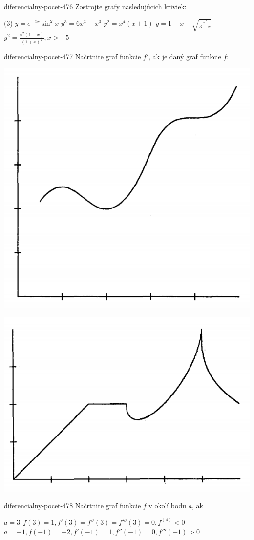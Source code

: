 \begin{defproblem}{diferencialny-pocet-476}
Zostrojte grafy nasledujúcich kriviek:
\begin{tasks}(3)
  \task $y=e^{-2x}\sin^2 x$
  \task $y^3=6x^2-x^3$
  \task $y^2=x^4(x+1)$
  \task $y=1-x+\sqrt{\frac{x^3}{3+x}}$
  \task* $y^2=\frac{x^2(1-x)}{(1+x)^2},x>-5$
\end{tasks}
\end{defproblem}

\begin{defproblem}{diferencialny-pocet-477}
Načrtnite graf funkcie $f'$, ak je daný graf funkcie $f$:
\begin{tasks}
\task

\includegraphics[scale=0.5]{img/pr. 477 1..png}

\task

\includegraphics[scale=0.5]{img/pr. 477 2..png}

\end{tasks}
\end{defproblem}

\begin{defproblem}{diferencialny-pocet-478}
Načrtnite graf funkcie $f$ v okolí bodu $a$, ak
\begin{tasks}
\task $a=3,f(3)=1,f'(3)=f''(3)=f'''(3)=0,f^{(4)}<0$
\task $a=-1,f(-1)=-2,f'(-1)=1,f''(-1)=0,f'''(-1)>0$
\end{tasks}
\end{defproblem}
